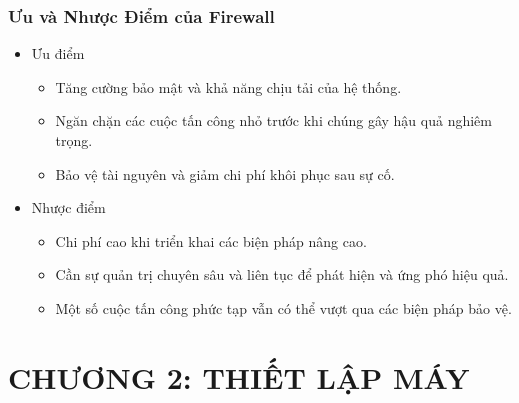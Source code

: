 \documentclass[13pt]{article}
\begin{document}
                \subsubsection{Ưu và Nhược Điểm của Firewall}
                \begin{itemize}
                    \item Ưu điểm
                    \begin{itemize}
                        \item Tăng cường bảo mật và khả năng chịu tải của hệ thống.
                        \item Ngăn chặn các cuộc tấn công nhỏ trước khi chúng gây hậu quả nghiêm trọng.
                        \item Bảo vệ tài nguyên và giảm chi phí khôi phục sau sự cố.
                    \end{itemize}
    
                    \item Nhược điểm
                    \begin{itemize}
                        \item Chi phí cao khi triển khai các biện pháp nâng cao.
                        \item Cần sự quản trị chuyên sâu và liên tục để phát hiện và ứng phó hiệu quả.
                        \item Một số cuộc tấn công phức tạp vẫn có thể vượt qua các biện pháp bảo vệ.
                        
                    \end{itemize}
                    \end{itemize}

                
	\section{CHƯƠNG 2: THIẾT LẬP MÁY }
\end{document}
